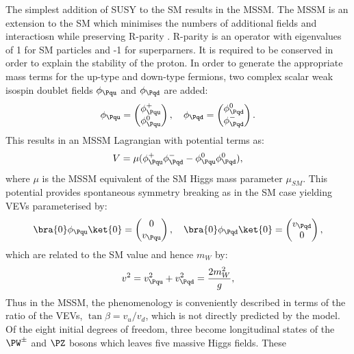 The simplest addition of SUSY to the \ac{SM} results in the \ac{MSSM}. The
\ac{MSSM} is an extension to the \ac{SM} which minimises the numbers of
additional fields and interactiosn while preserving R-parity \cite{Dimopoulos:1981zb}. R-parity
is an operator with eigenvalues of 1 for \ac{SM} particles and -1 for
superparners. It is required to be conserved in order to explain the stability
of the proton. In order to generate the appropriate mass terms for the up-type 
and down-type fermions, two complex scalar weak isospin doublet fields
$\phi_{\Pqu}$ and $\phi_{\Pqd}$ are added:
\begin{equation}
\phi_{\Pqu} = \begin{pmatrix}\phi_{\Pqu}^{+} \\ \phi_{\Pqu}^{0} \end{pmatrix}, \quad
\phi_{\Pqd} = \begin{pmatrix}\phi_{\Pqd}^{0} \\ \phi_{\Pqd}^{-} \end{pmatrix}. 
\end{equation}
This results in an \ac{MSSM} Lagrangian with potential terms as:
\begin{equation}
V=\mu(\phi_{\Pqu}^{+}\phi_{\Pqd}^{-} - \phi_{\Pqu}^{0}\phi_{\Pqd}^{0}),
\end{equation}
where $\mu$ is the \ac{MSSM} equivalent of the \ac{SM} Higgs mass parameter
$\mu_{SM}$. This potential provides spontaneous symmetry breaking as in the
\ac{SM} case yielding VEVs parameterised by:
\begin{equation}
\bra{0}\phi_{\Pqu}\ket{0} = \begin{pmatrix} 0 \\ v_{\Pqu}  \end{pmatrix}, \quad
\bra{0}\phi_{\Pqd}\ket{0} = \begin{pmatrix} v_{\Pqd} \\ 0 \end{pmatrix},
\end{equation}
which are related to the \ac{SM} value and hence $m_{W}$ by: 
\begin{equation}
v^{2} = v_{\Pqu}^{2} +  v_{\Pqd}^{2} =  \frac{2m_{W}^{2}}{g},
\end{equation}
Thus in the \ac{MSSM}, the
phenomenology is conveniently described in terms of the ratio of the VEVs,
$\tan\beta = v_{u}/v_{d}$, which is not directly predicted by the model.
Of the eight initial degrees of freedom, three become longitudinal states of the
$\PW^{\pm}$ and $\PZ$ bosons which leaves five massive Higgs fields. These
